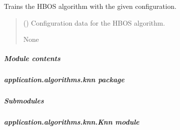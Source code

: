 \documentclass[letterpaper,10pt,english]{sphinxmanual}
\begin{document}
\begin{fulllineitems}
\begin{fulllineitems}
\label{\detokenize{application.algorithms.hbos:application.algorithms.hbos.HbosTrainer.HbosTrainer.train}}
\pysigstartsignatures
{}
\pysigstopsignatures
\sphinxAtStartPar
Trains the HBOS algorithm with the given configuration.
\begin{quote}\begin{description}
\sphinxAtStartPar
{} ({\hyperref[\detokenize{application.algorithms.hbos:application.algorithms.hbos.HbosConfiguration.HbosConfiguration}]{}}) \textendash{} Configuration data for the HBOS algorithm.

\sphinxAtStartPar
None

\end{description}\end{quote}

\end{fulllineitems}


\end{fulllineitems}



\subparagraph{Module contents}
\label{\detokenize{application.algorithms.hbos:module-application.algorithms.hbos}}\label{\detokenize{application.algorithms.hbos:module-contents}}
\sphinxstepscope


\subparagraph{application.algorithms.knn package}
\label{\detokenize{application.algorithms.knn:application-algorithms-knn-package}}\label{\detokenize{application.algorithms.knn::doc}}

\subparagraph{Submodules}
\label{\detokenize{application.algorithms.knn:submodules}}

\subparagraph{application.algorithms.knn.Knn module}
\label{\detokenize{application.algorithms.knn:module-application.algorithms.knn.Knn}}\label{\detokenize{application.algorithms.knn:application-algorithms-knn-knn-module}}
\end{document}
